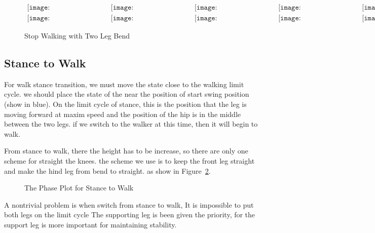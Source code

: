 \begin{figure}[!htbp]
  \begin{center}
        $\begin{array}{ccccc}
\texttt{[image: WalkStanceTransition/0001.eps]}&
\texttt{[image: WalkStanceTransition/0101.eps]}&
\texttt{[image: WalkStanceTransition/0201.eps]}&
\texttt{[image: WalkStanceTransition/0301.eps]}&
\texttt{[image: WalkStanceTransition/0401.eps]}
\\
\texttt{[image: WalkStanceTransition/0501.eps]}&
\texttt{[image: WalkStanceTransition/0601.eps]}&
\texttt{[image: WalkStanceTransition/0701.eps]}&
\texttt{[image: WalkStanceTransition/0801.eps]}&
\texttt{[image: WalkStanceTransition/0901.eps]}
\end{array}$
      
    \caption{Stop Walking with Two Leg Bend}
    \label{fig:walkstancestraight}
\end{center}
\end{figure}



\subsection{Stance to Walk}
For walk stance transition, we must move the state close to the walking limit cycle.
we should place the state of the near the position of start swing position (show in blue).
On the limit cycle of stance, this is the position that the leg is moving forward at maxim speed and the position of the hip is in the middle between the two legs.
if we switch to the walker at this time, then it will begin to walk.



From stance to walk, there the height has to be increase, so there are only one scheme for straight the knees.
the scheme we use is to keep the front leg straight and make the hind leg from bend to straight.
as show in Figure~\ref{fig:stance2walk}.
\begin{figure}[!htbp]
  \begin{center}
     
    \caption{The Phase Plot for Stance to Walk}
    \label{fig:stance2walk}
\end{center}
\end{figure}


A nontrivial problem is when switch from stance to walk, 
It is impossible to put both legs on the limit cycle
The supporting leg is been given the priority, for the support leg is more important for maintaining stability.





